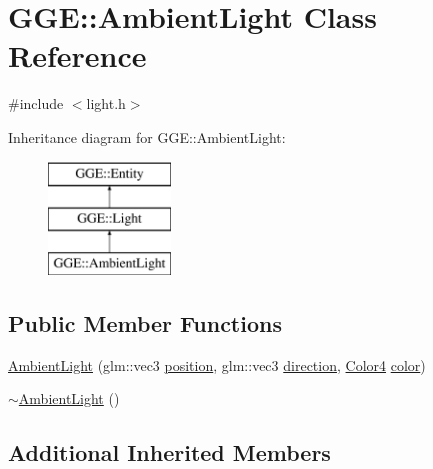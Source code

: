 \hypertarget{class_g_g_e_1_1_ambient_light}{\section{G\+G\+E\+:\+:Ambient\+Light Class Reference}
\label{class_g_g_e_1_1_ambient_light}
}


{\ttfamily \#include $<$light.\+h$>$}

Inheritance diagram for G\+G\+E\+:\+:Ambient\+Light\+:\begin{figure}[H]
\begin{center}
\leavevmode
\includegraphics[height=3.000000cm]{class_g_g_e_1_1_ambient_light}
\end{center}
\end{figure}
\subsection*{Public Member Functions}
\begin{DoxyCompactItemize}
\item 
\hyperlink{class_g_g_e_1_1_ambient_light_a4cc2db326ae3316ff6a81d3b5f670b91}{Ambient\+Light} (glm\+::vec3 \hyperlink{class_g_g_e_1_1_entity_a38a9fa01bfaf37ca415181ba6a179d3f}{position}, glm\+::vec3 \hyperlink{class_g_g_e_1_1_entity_a80c69365314541244f26e4a15b4223d8}{direction}, \hyperlink{namespace_g_g_e_aff43741fd756c83cbfd5d4d5cd9fcf41}{Color4} \hyperlink{class_g_g_e_1_1_light_a4d2f4605abc44637feac0d0312ce0717}{color})
\item 
\hyperlink{class_g_g_e_1_1_ambient_light_a43219fadd4eb1069f2998ca316ef427b}{$\sim$\+Ambient\+Light} ()
\end{DoxyCompactItemize}
\subsection*{Additional Inherited Members}



